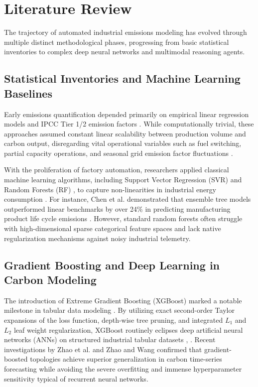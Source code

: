 \documentclass[conference]{IEEEtran}
\begin{document}
\section{Literature Review}

The trajectory of automated industrial emissions modeling has evolved through multiple distinct methodological phases, progressing from basic statistical inventories to complex deep neural networks and multimodal reasoning agents.

\subsection{Statistical Inventories and Machine Learning Baselines}
Early emissions quantification depended primarily on empirical linear regression models and IPCC Tier 1/2 emission factors \cite{ghgprotocol2004}. While computationally trivial, these approaches assumed constant linear scalability between production volume and carbon output, disregarding vital operational variables such as fuel switching, partial capacity operations, and seasonal grid emission factor fluctuations \cite{liu2022survey}.

With the proliferation of factory automation, researchers applied classical machine learning algorithms, including Support Vector Regression (SVR) \cite{drucker1996svr} and Random Forests (RF) \cite{breiman2001random}, to capture non-linearities in industrial energy consumption \cite{aras2022interpretable}. For instance, Chen et al. demonstrated that ensemble tree models outperformed linear benchmarks by over 24\% in predicting manufacturing product life cycle emissions \cite{chen2022lca}. However, standard random forests often struggle with high-dimensional sparse categorical feature spaces and lack native regularization mechanisms against noisy industrial telemetry.

\subsection{Gradient Boosting and Deep Learning in Carbon Modeling}
The introduction of Extreme Gradient Boosting (XGBoost) marked a notable milestone in tabular data modeling \cite{chen2016xgboost}. By utilizing exact second-order Taylor expansions of the loss function, depth-wise tree pruning, and integrated $L_1$ and $L_2$ leaf weight regularization, XGBoost routinely eclipses deep artificial neural networks (ANNs) on structured industrial tabular datasets \cite{aras2022interpretable}, \cite{fang2023energy}. Recent investigations by Zhao et al. \cite{zhao2024carbon} and Zhao and Wang \cite{zhao2025forecasting} confirmed that gradient-boosted topologies achieve superior generalization in carbon time-series forecasting while avoiding the severe overfitting and immense hyperparameter sensitivity typical of recurrent neural networks.
\end{document}
